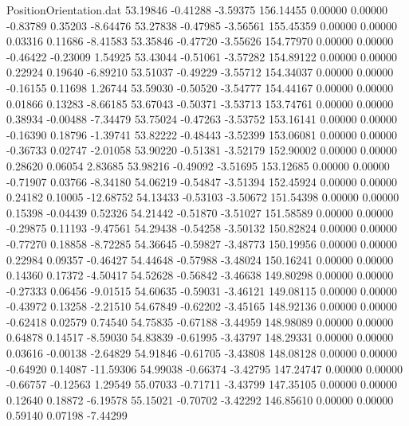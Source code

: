 \begin{filecontents}{PositionOrientation.dat}
  53.19846   -0.41288   -3.59375   156.14455    0.00000    0.00000   -0.83789    0.35203   -8.64476
  53.27838   -0.47985   -3.56561   155.45359    0.00000    0.00000    0.03316    0.11686   -8.41583
  53.35846   -0.47720   -3.55626   154.77970    0.00000    0.00000   -0.46422   -0.23009    1.54925
  53.43044   -0.51061   -3.57282   154.89122    0.00000    0.00000    0.22924    0.19640   -6.89210
  53.51037   -0.49229   -3.55712   154.34037    0.00000    0.00000   -0.16155    0.11698    1.26744
  53.59030   -0.50520   -3.54777   154.44167    0.00000    0.00000    0.01866    0.13283   -8.66185
  53.67043   -0.50371   -3.53713   153.74761    0.00000    0.00000    0.38934   -0.00488   -7.34479
  53.75024   -0.47263   -3.53752   153.16141    0.00000    0.00000   -0.16390    0.18796   -1.39741
  53.82222   -0.48443   -3.52399   153.06081    0.00000    0.00000   -0.36733    0.02747   -2.01058
  53.90220   -0.51381   -3.52179   152.90002    0.00000    0.00000    0.28620    0.06054    2.83685
  53.98216   -0.49092   -3.51695   153.12685    0.00000    0.00000   -0.71907    0.03766   -8.34180
  54.06219   -0.54847   -3.51394   152.45924    0.00000    0.00000    0.24182    0.10005  -12.68752
  54.13433   -0.53103   -3.50672   151.54398    0.00000    0.00000    0.15398   -0.04439    0.52326
  54.21442   -0.51870   -3.51027   151.58589    0.00000    0.00000   -0.29875    0.11193   -9.47561
  54.29438   -0.54258   -3.50132   150.82824    0.00000    0.00000   -0.77270    0.18858   -8.72285
  54.36645   -0.59827   -3.48773   150.19956    0.00000    0.00000    0.22984    0.09357   -0.46427
  54.44648   -0.57988   -3.48024   150.16241    0.00000    0.00000    0.14360    0.17372   -4.50417
  54.52628   -0.56842   -3.46638   149.80298    0.00000    0.00000   -0.27333    0.06456   -9.01515
  54.60635   -0.59031   -3.46121   149.08115    0.00000    0.00000   -0.43972    0.13258   -2.21510
  54.67849   -0.62202   -3.45165   148.92136    0.00000    0.00000   -0.62418    0.02579    0.74540
  54.75835   -0.67188   -3.44959   148.98089    0.00000    0.00000    0.64878    0.14517   -8.59030
  54.83839   -0.61995   -3.43797   148.29331    0.00000    0.00000    0.03616   -0.00138   -2.64829
  54.91846   -0.61705   -3.43808   148.08128    0.00000    0.00000   -0.64920    0.14087  -11.59306
  54.99038   -0.66374   -3.42795   147.24747    0.00000    0.00000   -0.66757   -0.12563    1.29549
  55.07033   -0.71711   -3.43799   147.35105    0.00000    0.00000    0.12640    0.18872   -6.19578
  55.15021   -0.70702   -3.42292   146.85610    0.00000    0.00000    0.59140    0.07198   -7.44299

\end{filecontents}
